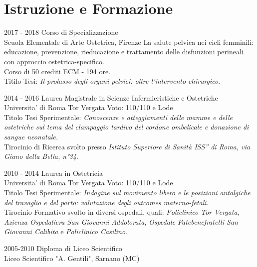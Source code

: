 \documentclass[11pt]{friggeri-cv}
\begin{document}
\vspace{-15pt}
\section{Istruzione e Formazione}
\begin{entrylist}
	\entry
	{2017 - 2018}
	{Corso di Specializzazione}
	{\\Scuola Elementale di Arte Ostetrica, Firenze}
	{La salute pelvica nei cicli femminili: educazione, prevenzione, 
    rieducazione e trattamento delle disfunzioni perineali con approccio 
    ostetrica-specifico. \\
    Corso di 50 crediti ECM - 194 ore.\\ 
    Titilo Tesi: \emph{Il prolasso degli organi pelvici: oltre l’intervento chirurgico}.\\}

	\entry
	{2014 - 2016}
	{Laurea Magistrale in Scienze Infermieristiche e Ostetriche}
	{\\Universita' di Roma Tor Vergata}
	{Voto: 110/110 e Lode\\ Titolo Tesi Sperimentale: \emph{Conoscenze e 
	atteggiamenti delle mamme e delle ostetriche sul tema del clampaggio tardivo del 
	cordone ombelicale e donazione di sangue neonatale.} \\Tirocinio di Ricerca svolto 
	presso \textit{Istituto Superiore di Sanità ISS” di Roma, via Giano della Bella, 
	n°34}.\\}
	
	\entry
	{2010 - 2014}
	{Laurea in Ostetricia}
	{\\Universita' di Roma Tor Vergata}
	{Voto: 110/110 e Lode\\
    Titolo Tesi Sperimentale: \emph{Indagine sul movimento libero e le posizioni 
    antalgiche del travaglio e del parto: valutazione degli outcomes materno-fetali.} \\
    Tirocinio Formativo svolto in diversi ospedali, quali: \textit{Policlinico Tor 
    Vergata}, \textit{Azienza Ospedaliera San Giovanni Addolorata}, 
    \textit{Ospedale Fatebenefratelli San Giovanni Calibita} e \textit{Policlinico 
    Casilino}.\\}

	\entry
	{2005-2010}
	{Diploma di Liceo Scientifico}
	{\\Liceo Scientifico "A. Gentili", Sarnano (MC)}
	{\\}
\end{entrylist}

\vspace{-25pt}
\end{document}
